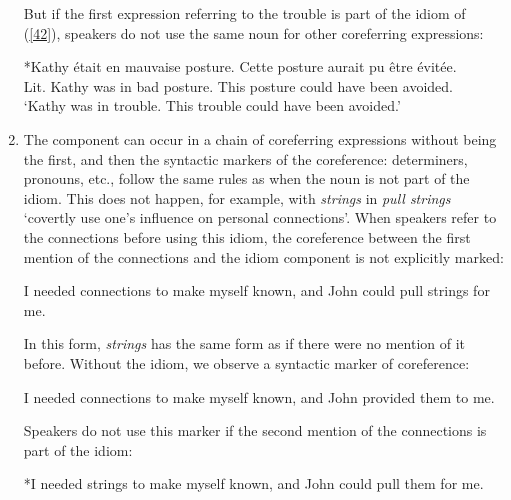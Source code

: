 \documentclass[output=paper]{langsci/langscibook}
\begin{document}
\begin{enumerate}
But if the first expression referring to the trouble is part of the idiom of (\ref{42}), speakers do not use the same noun for other coreferring expressions:

\begin{exe}
\ex \label{45}
*Kathy était en mauvaise posture. Cette posture aurait pu être évitée.\\
Lit. Kathy was in bad posture. This posture could have  been avoided.\\
{
`Kathy was in trouble. This trouble could have been avoided.'{\footnotemark}}
\end{exe}

\item  The component can occur in a chain of coreferring expressions without being the first, and then the syntactic markers of the coreference: determiners, pronouns, etc., follow the same rules as when the noun is not part of the idiom. This does not happen, for example, with \textit{strings} in \textit{pull strings} ‘covertly use one’s influence on personal connections’. When speakers refer to the connections before using this idiom, the coreference between the first mention of the connections and the idiom component is not explicitly marked:

\begin{exe}
\ex \label{46}
I needed connections to make myself known, and John could pull strings for me.
\end{exe}

In this form, \textit{strings} has the same form as if there were no mention of it before. Without the idiom, we observe a syntactic marker of coreference:

\begin{exe}
\ex \label{47}
I needed connections to make myself known, and John provided them to me.
\end{exe}

Speakers do not use this marker if the second mention of the connections is part of the idiom:

\begin{exe}
\ex \label{48}
*I needed strings to make myself known, and John could pull them for me.
\end{exe}

\end{enumerate}
\end{document}
